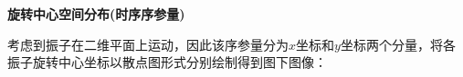 \documentclass{article}
\begin{document}


\newpage
\noindent\textbf{旋转中心空间分布(时序序参量)}

考虑到振子在二维平面上运动，因此该序参量分为$x$坐标和$y$坐标两个分量，将各振子旋转中心坐标以散点图形式分别绘制得到图下图像：
\end{document}
